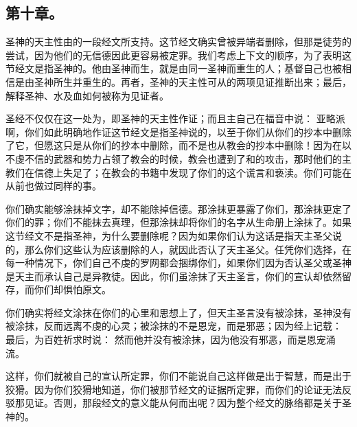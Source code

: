 
\subsection{第十章。}

圣神的天主性由的一段经文所支持。这节经文确实曾被异端者删除，但那是徒劳的尝试，因为他们的无信德因此更容易被定罪。我们考虑上下文的顺序，为了表明这节经文是指圣神的。他由圣神而生，就是由同一圣神而重生的人；基督自己也被相信是由圣神所生并重生的。再者，圣神的天主性可从的两项见证推断出来；最后，解释圣神、水及血如何被称为见证者。\par

圣经不仅仅在这一处为，即圣神的天主性作证；而且主自己在福音中说： 亚略派啊，你们如此明确地作证这节经文是指圣神说的，以至于你们从你们的抄本中删除了它，但愿这只是从你们的抄本中删除，而不是也从教会的抄本中删除！因为在以不虔不信的武器和势力占领了教会的时候，教会也遭到了和的攻击，那时他们的主教们在信德上失足了；在教会的书籍中发现了你们的这个谎言和亵渎。你们可能在从前也做过同样的事。\par

你们确实能够涂抹掉文字，却不能除掉信德。那涂抹更暴露了你们，那涂抹更定了你们的罪；你们不能抹去真理，但那涂抹却将你们的名字从生命册上涂抹了。如果这节经文不是指圣神，为什么要删除呢？因为如果你们认为这话是指天主圣父说的，那么你们这些认为应该删除的人，就因此否认了天主圣父。任凭你们选择，在每一种情况下，你们自己不虔的罗网都会捆绑你们，如果你们因为否认圣父或圣神是天主而承认自己是异教徒。因此，你们虽涂抹了天主圣言，你们的宣认却依然留存，而你们却惧怕原文。\par

你们确实将经文涂抹在你们的心里和思想上了，但天主圣言没有被涂抹，圣神没有被涂抹，反而远离不虔的心灵；被涂抹的不是恩宠，而是邪恶；因为经上记载： 最后，为百姓祈求时说： 然而他并没有被涂抹，因为他没有邪恶，而是恩宠涌流。\par

这样，你们就被自己的宣认所定罪，你们不能说自己这样做是出于智慧，而是出于狡猾。因为你们狡猾地知道，你们被那节经文的证据所定罪，而你们的论证无法反驳那见证。否则，那段经文的意义能从何而出呢？因为整个经文的脉络都是关于圣神的。\par

